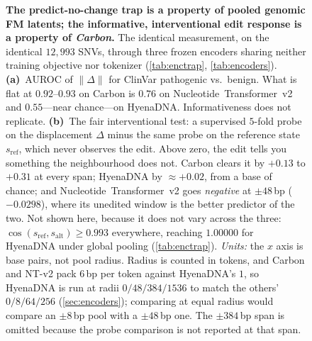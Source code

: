 {\begin{figure}[t]
  \caption{\textbf{The predict-no-change trap is a property of pooled genomic FM latents; the
  informative, interventional edit response is a property of \emph{Carbon}.} The identical
  measurement, on the identical $12{,}993$ SNVs, through three frozen encoders sharing neither
  training objective nor tokenizer (\cref{tab:enctrap}, \cref{tab:encoders}). \textbf{(a)}~AUROC of
  $\lVert\Delta\rVert$ for ClinVar pathogenic vs.\ benign. What is flat at $0.92$--$0.93$ on Carbon
  is $0.76$ on Nucleotide~Transformer~v2 and $0.55$---near chance---on HyenaDNA. Informativeness
  does not replicate. \textbf{(b)}~The fair interventional test: a supervised $5$-fold probe on the
  displacement $\Delta$ minus the same probe on the reference state $s_{\mathrm{ref}}$, which never
  observes the edit. Above zero, the edit tells you something the neighbourhood does not. Carbon
  clears it by $+0.13$ to $+0.31$ at every span; HyenaDNA by $\approx+0.02$, from a base of chance;
  and Nucleotide~Transformer~v2 goes \emph{negative} at $\pm48$\,bp ($-0.0298$), where its unedited
  window is the better predictor of the two. Not shown here, because it does not vary across the
  three: $\cos(s_{\mathrm{ref}},s_{\mathrm{alt}}) \ge 0.993$ everywhere, reaching $1.00000$ for
  HyenaDNA under global pooling (\cref{tab:enctrap}). \emph{Units:} the $x$ axis is base pairs, not
  pool radius. Radius is counted in tokens, and Carbon and NT-v2 pack $6$\,bp per token against
  HyenaDNA's $1$, so HyenaDNA is run at radii $0/48/384/1536$ to match the others' $0/8/64/256$
  (\cref{sec:encoders}); comparing at equal radius would compare an $\pm8$\,bp pool with a
  $\pm48$\,bp one. The $\pm384$\,bp span is omitted because the probe comparison is not reported at
  that span.}
  \label{fig:encoders}
\end{figure}}
